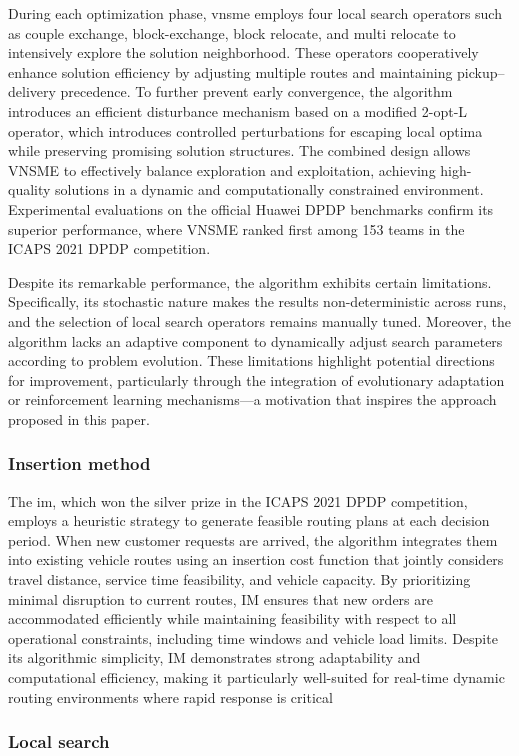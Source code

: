 \documentclass[]{interact}
\begin{document}
During each optimization phase, \gls{vnsme} employs four local search operators such as couple exchange, block-exchange, block relocate, and multi relocate to intensively explore the solution neighborhood. These operators cooperatively enhance solution efficiency by adjusting multiple routes and maintaining pickup–delivery precedence. To further prevent early convergence, the algorithm introduces an efficient disturbance mechanism based on a modified 2-opt-L operator, which introduces controlled perturbations for escaping local optima while preserving promising solution structures. The combined design allows VNSME to effectively balance exploration and exploitation, achieving high-quality solutions in a dynamic and computationally constrained environment. Experimental evaluations on the official Huawei DPDP benchmarks confirm its superior performance, where VNSME ranked first among 153 teams in the ICAPS 2021 DPDP competition.

Despite its remarkable performance, the algorithm exhibits certain limitations. Specifically, its stochastic nature makes the results non-deterministic across runs, and the selection of local search operators remains manually tuned. Moreover, the algorithm lacks an adaptive component to dynamically adjust search parameters according to problem evolution. These limitations highlight potential directions for improvement, particularly through the integration of evolutionary adaptation or reinforcement learning mechanisms—a motivation that inspires the approach proposed in this paper.
\subsubsection{Insertion method}
The \gls{im}, which won the silver prize in the ICAPS 2021 DPDP competition, employs a heuristic strategy to generate feasible routing plans at each decision period. When new customer requests are arrived, the algorithm integrates them into existing vehicle routes using an insertion cost function that jointly considers travel distance, service time feasibility, and vehicle capacity. By prioritizing minimal disruption to current routes, IM ensures that new orders are accommodated efficiently while maintaining feasibility with respect to all operational constraints, including time windows and vehicle load limits. Despite its algorithmic simplicity, IM demonstrates strong adaptability and computational efficiency, making it particularly well-suited for real-time dynamic routing environments where rapid response is critical
\subsubsection{Local search}
\end{document}
